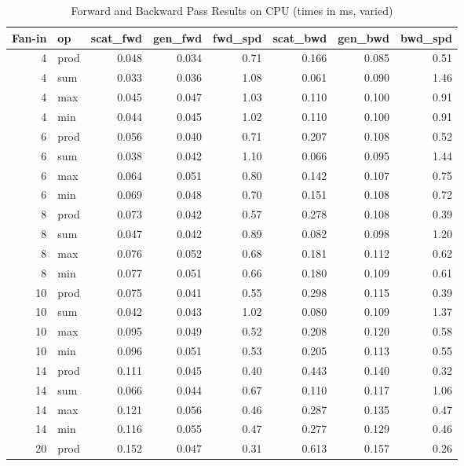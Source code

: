 \documentclass[11pt]{article}
\begin{document}
\begin{table}[H]
\centering
\caption{Forward and Backward Pass Results on CPU (times in ms, varied)}
\label{tab:results_cpu}
\footnotesize
\begin{tabular}{@{}rlrrrrrr@{}}
\toprule
Fan-in & op & scat\_fwd & gen\_fwd & fwd\_spd & scat\_bwd & gen\_bwd & bwd\_spd \\
\midrule
        4 & prod & 0.048 & 0.034 & 0.71 & 0.166 & 0.085 & 0.51 \\
        4 & sum & 0.033 & 0.036 & 1.08 & 0.061 & 0.090 & 1.46 \\
        4 & max & 0.045 & 0.047 & 1.03 & 0.110 & 0.100 & 0.91 \\
        4 & min & 0.044 & 0.045 & 1.02 & 0.110 & 0.100 & 0.91 \\
        6 & prod & 0.056 & 0.040 & 0.71 & 0.207 & 0.108 & 0.52 \\
        6 & sum & 0.038 & 0.042 & 1.10 & 0.066 & 0.095 & 1.44 \\
        6 & max & 0.064 & 0.051 & 0.80 & 0.142 & 0.107 & 0.75 \\
        6 & min & 0.069 & 0.048 & 0.70 & 0.151 & 0.108 & 0.72 \\
        8 & prod & 0.073 & 0.042 & 0.57 & 0.278 & 0.108 & 0.39 \\
        8 & sum & 0.047 & 0.042 & 0.89 & 0.082 & 0.098 & 1.20 \\
        8 & max & 0.076 & 0.052 & 0.68 & 0.181 & 0.112 & 0.62 \\
        8 & min & 0.077 & 0.051 & 0.66 & 0.180 & 0.109 & 0.61 \\
        10 & prod & 0.075 & 0.041 & 0.55 & 0.298 & 0.115 & 0.39 \\
        10 & sum & 0.042 & 0.043 & 1.02 & 0.080 & 0.109 & 1.37 \\
        10 & max & 0.095 & 0.049 & 0.52 & 0.208 & 0.120 & 0.58 \\
        10 & min & 0.096 & 0.051 & 0.53 & 0.205 & 0.113 & 0.55 \\
        14 & prod & 0.111 & 0.045 & 0.40 & 0.443 & 0.140 & 0.32 \\
        14 & sum & 0.066 & 0.044 & 0.67 & 0.110 & 0.117 & 1.06 \\
        14 & max & 0.121 & 0.056 & 0.46 & 0.287 & 0.135 & 0.47 \\
        14 & min & 0.116 & 0.055 & 0.47 & 0.277 & 0.129 & 0.46 \\
        20 & prod & 0.152 & 0.047 & 0.31 & 0.613 & 0.157 & 0.26 \\

\end{tabular}
\end{table}
\end{document}
